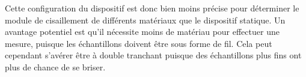 Cette configuration du dispositif est donc bien moins précise pour déterminer le module de cisaillement de différents matériaux que le dispositif statique. Un avantage potentiel est qu'il nécessite moins de matériau pour effectuer une mesure, puisque les échantillons doivent être sous forme de fil. Cela peut cependant s'avérer être à double tranchant puisque des échantillons plus fins ont plus de chance de se briser.

